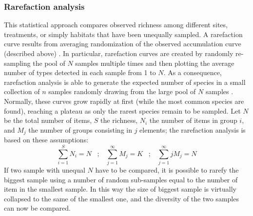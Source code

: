 \subsubsection*{Rarefaction analysis}
This statistical approach compares observed richness among different sites, treatments, or simply habitats that have been unequally sampled. A rarefaction curve results from averaging randomization of the observed accumulation curve (described above) \cite{foote1992rarefaction}. In particular, rarefaction curves are created by randomly re-sampling the pool of $N$ samples multiple times and then plotting the average number of types detected in each sample from 1 to $N$. As a consequence, rarefaction analysis is able to generate the expected number of species in a small collection of $n$ samples randomly drawing from the large pool of $N$ samples \cite{gotelli2001quantifying}. Normally, these curves grow rapidly at first (while the most common species are found), reaching a plateau as only the rarest species remain to be sampled. Let $N$ be the total number of items, $S$ the richness, $N_i$ the number of items in group $i$, and $M_j$ the number of groups consisting in $j$ elements; the rarefaction analysis is based on these assumptions:
\begin{equation*}
\sum_{i=1}^S N_i = N \hspace{10pt};\hspace{10pt} 
\sum_{j=1}^{\infty} M_j = K \hspace{10pt};\hspace{10pt}
\sum_{j=1}^{\infty} jM_j = N
\end{equation*}
If two sample with unequal $N$ have to be compared, it is possible to rarefy the biggest sample using a number of random sub-samples equal to the number of item in the smallest sample. In this way the size of biggest sample is virtually collapsed to the same of the smallest one, and the diversity of the two samples can now be compared.\\

